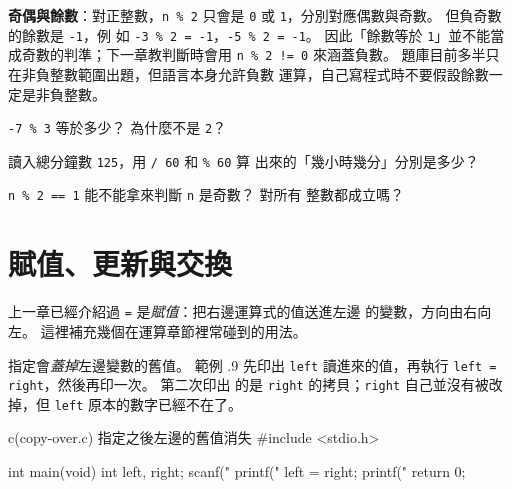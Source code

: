 
\textbf{奇偶與餘數}：對正整數，\texttt{n \% 2} 只會是 \texttt{0} 或
\texttt{1}，分別對應偶數與奇數。 但負奇數的餘數是 \texttt{-1}，例
如 \texttt{-3 \% 2 = -1}，\texttt{-5 \% 2 = -1}。 因此「餘數等於
\texttt{1}」並不能當成奇數的判準；下一章教判斷時會用 \texttt{n \% 2 != 0}
來涵蓋負數。 題庫目前多半只在非負整數範圍出題，但語言本身允許負數
運算，自己寫程式時不要假設餘數一定是非負整數。


\begin{drills}[label=drills:arith-intdiv]
\item \texttt{-7 \% 3} 等於多少？ 為什麼不是 \texttt{2}？
\item 讀入總分鐘數 \texttt{125}，用 \texttt{/ 60} 和 \texttt{\% 60} 算
出來的「幾小時幾分」分別是多少？
\item \texttt{n \% 2 == 1} 能不能拿來判斷 \texttt{n} 是奇數？ 對所有
整數都成立嗎？
\end{drills}

\section{賦值、更新與交換}
\label{sec:arith-assign-update-swap}

上一章已經介紹過 \texttt{=} 是\emph{賦值}：把右邊運算式的值送進左邊
的變數，方向由右向左。 這裡補充幾個在運算章節裡常碰到的用法。

指定會\emph{蓋掉}左邊變數的舊值。 範例 \thechapter.9 先印出 \texttt{left}
讀進來的值，再執行 \texttt{left = right}，然後再印一次。 第二次印出
的是 \texttt{right} 的拷貝；\texttt{right} 自己並沒有被改掉，但
\texttt{left} 原本的數字已經不在了。

\begin{example}{c}{(copy-over.c) 指定之後左邊的舊值消失}
#include <stdio.h>

int main(void) {
    int left, right;
    scanf("%
    printf("%
    left = right;
    printf("%
    return 0;
}
\end{example}

